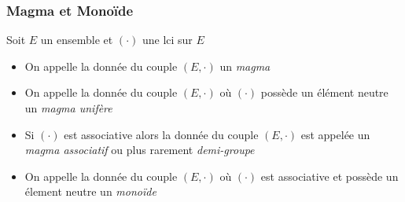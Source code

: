 \documentclass[11pt,colorlinks]{book}
\theoremstyle{mytheoremstyle}
\theoremstyle{mytheoremstyle}
\theoremstyle{mytheoremstyle}
\theoremstyle{mytheoremstyle}
\theoremstyle{mytheoremstyle}
\theoremstyle{mytheoremstyle}
\theoremstyle{mytheoremstyle}
\theoremstyle{mytheoremstyle}
\theoremstyle{myproblemstyle}
\begin{document}
\subsubsection{Magma et Monoïde}
\begin{rmq}
  Soit $E$ un ensemble et $(\cdot)$ une lci sur $E$ 
  \begin{itemize}
    \item On appelle la donnée du couple $(E,\cdot)$ un \textit{magma}
    \item On appelle la donnée du couple $(E,\cdot)$ où $(\cdot)$ possède un élément neutre un \textit{magma unifère}
    \item Si $(\cdot)$ est associative alors la donnée du couple $(E,\cdot)$ est appelée un \textit{magma associatif} ou plus rarement \textit{demi-groupe}
    \item On appelle la donnée du couple $(E,\cdot)$ où $(\cdot)$ est associative et possède un élement neutre un \textit{monoïde}
  \end{itemize}
\end{rmq}
\end{document}
